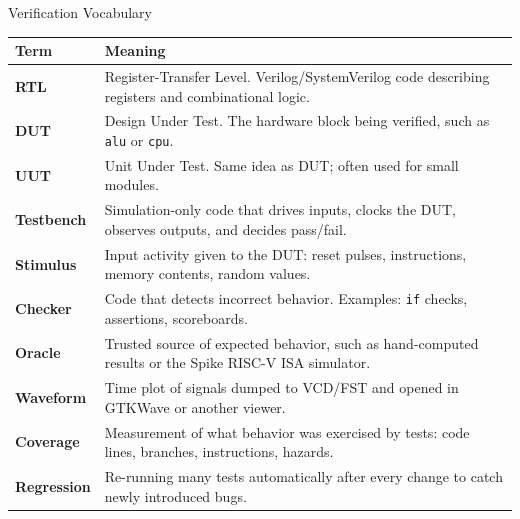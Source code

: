 \documentclass[aspectratio=169,10pt]{beamer}
\begin{document}
\begin{frame}{Verification Vocabulary}
  \renewcommand{\arraystretch}{1.25}
  \small
  \begin{tabular}{>{\bfseries\ttfamily}l p{10.5cm}}
    \toprule
    Term & Meaning \\
    \midrule
    RTL & Register-Transfer Level. Verilog/SystemVerilog code describing registers and combinational logic. \\
    DUT & Design Under Test. The hardware block being verified, such as \texttt{alu} or \texttt{cpu}. \\
    UUT & Unit Under Test. Same idea as DUT; often used for small modules. \\
    Testbench & Simulation-only code that drives inputs, clocks the DUT, observes outputs, and decides pass/fail. \\
    Stimulus & Input activity given to the DUT: reset pulses, instructions, memory contents, random values. \\
    Checker & Code that detects incorrect behavior. Examples: \texttt{if} checks, assertions, scoreboards. \\
    Oracle & Trusted source of expected behavior, such as hand-computed results or the Spike RISC-V ISA simulator. \\
    Waveform & Time plot of signals dumped to VCD/FST and opened in GTKWave or another viewer. \\
    Coverage & Measurement of what behavior was exercised by tests: code lines, branches, instructions, hazards. \\
    Regression & Re-running many tests automatically after every change to catch newly introduced bugs. \\
    \bottomrule
  \end{tabular}
\end{frame}
\end{document}

